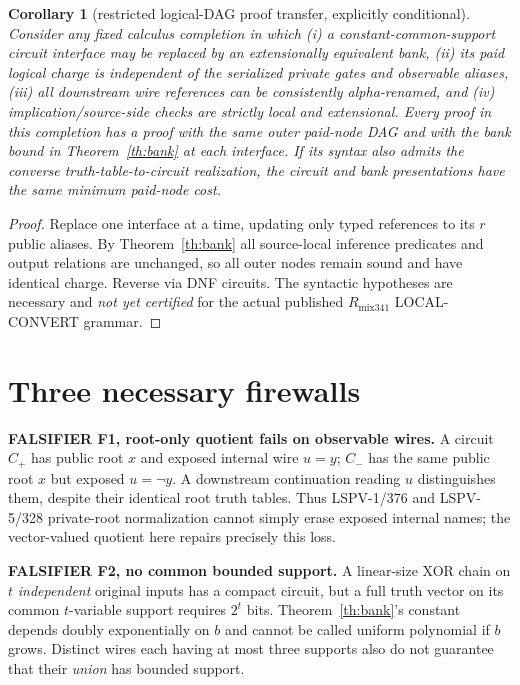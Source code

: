 \documentclass[11pt]{article}
\newtheorem{corollary}[theorem]{Corollary}
\begin{document}
\begin{corollary}[restricted logical-DAG proof transfer, explicitly conditional]
Consider any \emph{fixed} calculus completion in which (i) a constant-common-support circuit interface may be replaced by an extensionally equivalent bank, (ii) its paid logical charge is independent of the serialized private gates and observable aliases, (iii) all downstream wire references can be consistently alpha-renamed, and (iv) implication/source-side checks are strictly local and extensional. Every proof in this completion has a proof with the same outer paid-node DAG and with the bank bound in Theorem~\ref{th:bank} at each interface. If its syntax also admits the converse truth-table-to-circuit realization, the circuit and bank presentations have the \emph{same} minimum paid-node cost.
\end{corollary}
\begin{proof} Replace one interface at a time, updating only typed references to its $r$ public aliases. By Theorem~\ref{th:bank} all source-local inference predicates and output relations are unchanged, so all outer nodes remain sound and have identical charge. Reverse via DNF circuits. The syntactic hypotheses are necessary and \emph{not yet certified} for the actual published $R_{\mathrm{mix341}}$ LOCAL-CONVERT grammar. \end{proof}

\section*{Three necessary firewalls}
\noindent\textbf{FALSIFIER F1, root-only quotient fails on observable wires.} A circuit $C_+$ has public root $x$ and exposed internal wire $u=y$; $C_-$ has the same public root $x$ but exposed $u=\neg y$. A downstream continuation reading $u$ distinguishes them, despite their identical root truth tables. Thus LSPV-1/376 and LSPV-5/328 private-root normalization cannot simply erase exposed internal names; the vector-valued quotient here repairs precisely this loss.

\noindent\textbf{FALSIFIER F2, no common bounded support.} A linear-size XOR chain on $t$ \emph{independent} original inputs has a compact circuit, but a full truth vector on its common $t$-variable support requires $2^t$ bits. Theorem~\ref{th:bank}'s constant depends doubly exponentially on $b$ and cannot be called uniform polynomial if $b$ grows. Distinct wires each having at most three supports also do not guarantee that their \emph{union} has bounded support.
\end{document}
